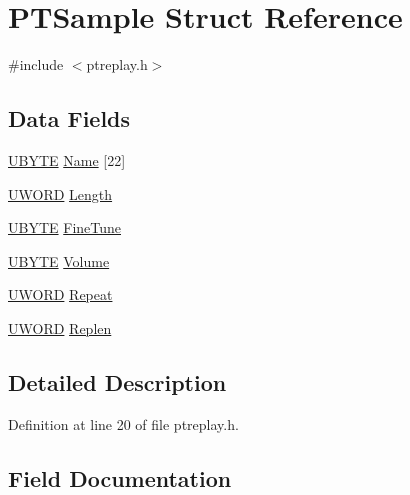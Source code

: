 \hypertarget{struct_p_t_sample}{}\section{P\+T\+Sample Struct Reference}
\label{struct_p_t_sample}


{\ttfamily \#include $<$ptreplay.\+h$>$}

\subsection*{Data Fields}
\begin{DoxyCompactItemize}
\item 
\mbox{\hyperlink{utils_8h_a122c4acf389c050379f00341fdcd5812}{U\+B\+Y\+TE}} \mbox{\hyperlink{struct_p_t_sample_a2930d43823ce0cfa3e09afab221cf07c}{Name}} \mbox{[}22\mbox{]}
\item 
\mbox{\hyperlink{utils_8h_aefbb6ca39ebcf009709e607d159766d5}{U\+W\+O\+RD}} \mbox{\hyperlink{struct_p_t_sample_a6e5423b9f55b8837d3f507785bc4a5d1}{Length}}
\item 
\mbox{\hyperlink{utils_8h_a122c4acf389c050379f00341fdcd5812}{U\+B\+Y\+TE}} \mbox{\hyperlink{struct_p_t_sample_a350e17f51a7789cd11acfb479b83e2c2}{Fine\+Tune}}
\item 
\mbox{\hyperlink{utils_8h_a122c4acf389c050379f00341fdcd5812}{U\+B\+Y\+TE}} \mbox{\hyperlink{struct_p_t_sample_adc4b7a0c5b86145401ff9bf56d52bf7a}{Volume}}
\item 
\mbox{\hyperlink{utils_8h_aefbb6ca39ebcf009709e607d159766d5}{U\+W\+O\+RD}} \mbox{\hyperlink{struct_p_t_sample_a6ac10154fdd34624e96ff77b540f598e}{Repeat}}
\item 
\mbox{\hyperlink{utils_8h_aefbb6ca39ebcf009709e607d159766d5}{U\+W\+O\+RD}} \mbox{\hyperlink{struct_p_t_sample_a394fbd880f8bd006214517333330cd48}{Replen}}
\end{DoxyCompactItemize}


\subsection{Detailed Description}


Definition at line 20 of file ptreplay.\+h.



\subsection{Field Documentation}
\mbox{\label{struct_p_t_sample_a350e17f51a7789cd11acfb479b83e2c2}} 
